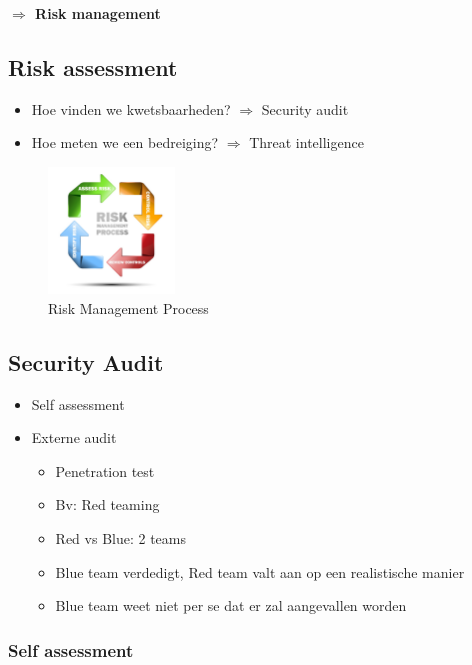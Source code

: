 \documentclass{article}
\newcommand{\bold}[1]{\textbf{#1}}
\begin{document}
\bold{$\Rightarrow$ Risk management}


\subsection{Risk assessment}
\begin{itemize}
    \item Hoe vinden we kwetsbaarheden? $\Rightarrow$ Security audit
    \item Hoe meten we een bedreiging? $\Rightarrow$ Threat intelligence
\end{itemize}

\begin{figure}[H]
    \centering
    \includegraphics[width=0.3\textwidth]{risk-management-process.jpg}
    \caption{Risk Management Process}
\end{figure}

\subsection{Security Audit}

\begin{itemize}
    \item Self assessment
    \item Externe audit
    \begin{itemize}
        \item Penetration test 
        \item Bv: Red teaming
        \item Red vs Blue: 2 teams
        \item Blue team verdedigt, Red team valt aan op een realistische manier
        \item Blue team weet niet per se dat er zal aangevallen worden
    \end{itemize} 
\end{itemize}

\subsubsection{Self assessment}
\end{document}
